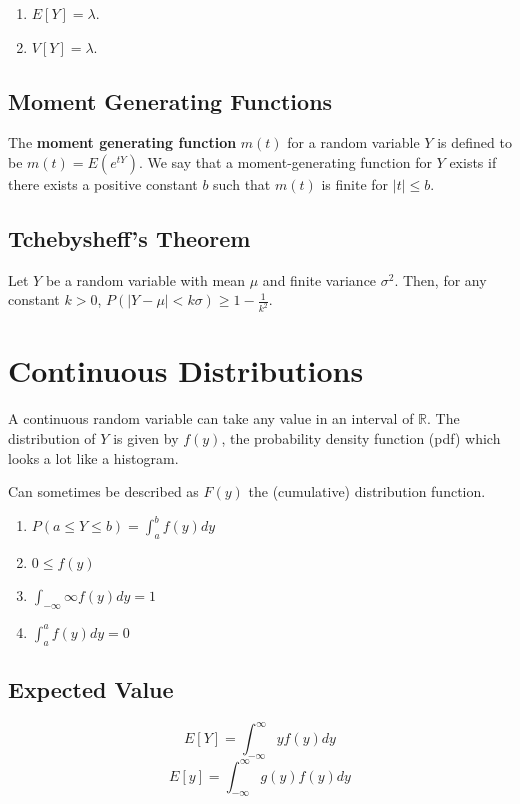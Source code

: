 \documentclass{article}
\begin{document}
\begin{enumerate}
  \item $E[Y]=\lambda$.
  \item $V[Y]=\lambda$.
\end{enumerate}

\subsection{Moment Generating Functions}
The \textbf{moment generating function} $m(t)$ for a random variable $Y$ is
defined to be $m(t)=E(e^{tY})$. We say that a moment-generating function for
$Y$ exists if there exists a positive constant $b$ such that $m(t)$ is finite
for $|t| \leq b$.

\subsection{Tchebysheff's Theorem}
Let $Y$ be a random variable with mean $\mu$ and finite variance $\sigma^2$.
Then, for any constant $k>0$, $P(|Y-\mu|<k\sigma)\geq 1-\frac{1}{k^2}$.

\section{Continuous Distributions}
A continuous random variable can take any value in an interval of $\mathbb{R}$.
The distribution of $Y$ is given by $f(y)$, the probability density function
(pdf) which looks a lot like a histogram.

Can sometimes be described as $F(y)$ the (cumulative) distribution function.

\begin{enumerate}
  \item $P(a \leq Y \leq b) = \int_a^bf(y)dy$
  \item $0 \leq f(y)$
  \item $\int_{-\infty}{\infty} f(y)dy = 1$
  \item $\int_a^a f(y) dy = 0$
\end{enumerate}

\subsection{Expected Value}
\begin{equation}
  E[Y] = \int_{-\infty}^{\infty} y f(y) dy
\end{equation}
\begin{equation}
  E[y] = \int_{-\infty}^{\infty} g(y) f(y) dy
\end{equation}
\end{document}

